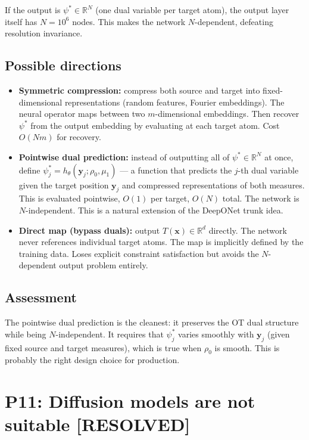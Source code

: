\documentclass[11pt]{article}
\newcommand{\RR}{\mathbb{R}}
\newcommand{\bx}{\mathbf{x}}
\newcommand{\by}{\mathbf{y}}
\newcommand{\statusresolved}{\textcolor{resolved}{\textbf{[RESOLVED]}}}
\begin{document}
If the output is $\psi^* \in \RR^N$ (one dual variable per target atom), the output layer itself has $N = 10^6$ nodes. This makes the network $N$-dependent, defeating resolution invariance.

\subsection*{Possible directions}
\begin{itemize}[nosep,leftmargin=1.5em]
    \item \textbf{Symmetric compression:} compress both source and target into fixed-dimensional representations (random features, Fourier embeddings). The neural operator maps between two $m$-dimensional embeddings. Then recover $\psi^*$ from the output embedding by evaluating at each target atom. Cost $O(Nm)$ for recovery.
    \item \textbf{Pointwise dual prediction:} instead of outputting all of $\psi^* \in \RR^N$ at once, define $\psi^*_j = h_\theta(\by_j; \rho_0, \mu_1)$ --- a function that predicts the $j$-th dual variable given the target position $\by_j$ and compressed representations of both measures. This is evaluated pointwise, $O(1)$ per target, $O(N)$ total. The network is $N$-independent. This is a natural extension of the DeepONet trunk idea.
    \item \textbf{Direct map (bypass duals):} output $T(\bx) \in \RR^d$ directly. The network never references individual target atoms. The map is implicitly defined by the training data. Loses explicit constraint satisfaction but avoids the $N$-dependent output problem entirely.
\end{itemize}

\subsection*{Assessment}
The pointwise dual prediction is the cleanest: it preserves the OT dual structure while being $N$-independent. It requires that $\psi^*_j$ varies smoothly with $\by_j$ (given fixed source and target measures), which is true when $\rho_0$ is smooth. This is probably the right design choice for production.

\section{P11: Diffusion models are not suitable \statusresolved}
\end{document}

